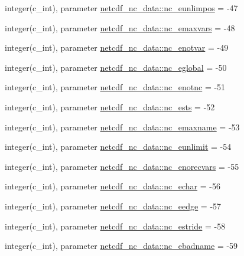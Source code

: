 \begin{DoxyCompactItemize}
\item 
integer(c\+\_\+int), parameter \hyperlink{namespacenetcdf__nc__data_a62be59604a485bc9d1259a8a94a9e501}{netcdf\+\_\+nc\+\_\+data\+::nc\+\_\+eunlimpos} = -\/47
\item 
integer(c\+\_\+int), parameter \hyperlink{namespacenetcdf__nc__data_a21a339b9ce80e3705aedc309fcb6be3c}{netcdf\+\_\+nc\+\_\+data\+::nc\+\_\+emaxvars} = -\/48
\item 
integer(c\+\_\+int), parameter \hyperlink{namespacenetcdf__nc__data_ae87507dd9130d6f4ef66daa3626cc6c8}{netcdf\+\_\+nc\+\_\+data\+::nc\+\_\+enotvar} = -\/49
\item 
integer(c\+\_\+int), parameter \hyperlink{namespacenetcdf__nc__data_a4bf9349dddd9a80ce363bb89be890f29}{netcdf\+\_\+nc\+\_\+data\+::nc\+\_\+eglobal} = -\/50
\item 
integer(c\+\_\+int), parameter \hyperlink{namespacenetcdf__nc__data_a54890d95abf2cb564d7294f2f7e04af6}{netcdf\+\_\+nc\+\_\+data\+::nc\+\_\+enotnc} = -\/51
\item 
integer(c\+\_\+int), parameter \hyperlink{namespacenetcdf__nc__data_a1d5fe03e609c4e9a402517518099f92e}{netcdf\+\_\+nc\+\_\+data\+::nc\+\_\+ests} = -\/52
\item 
integer(c\+\_\+int), parameter \hyperlink{namespacenetcdf__nc__data_aed1b24db9fb95b548b1b2c88d05cc036}{netcdf\+\_\+nc\+\_\+data\+::nc\+\_\+emaxname} = -\/53
\item 
integer(c\+\_\+int), parameter \hyperlink{namespacenetcdf__nc__data_a97e13a4f19397a41377c919316b1f75f}{netcdf\+\_\+nc\+\_\+data\+::nc\+\_\+eunlimit} = -\/54
\item 
integer(c\+\_\+int), parameter \hyperlink{namespacenetcdf__nc__data_ac9cf156c3357804270d95bef39921992}{netcdf\+\_\+nc\+\_\+data\+::nc\+\_\+enorecvars} = -\/55
\item 
integer(c\+\_\+int), parameter \hyperlink{namespacenetcdf__nc__data_a8b67da1d7539ef650246387c0a914653}{netcdf\+\_\+nc\+\_\+data\+::nc\+\_\+echar} = -\/56
\item 
integer(c\+\_\+int), parameter \hyperlink{namespacenetcdf__nc__data_a17523983ee6366a4460590b0a0622c40}{netcdf\+\_\+nc\+\_\+data\+::nc\+\_\+eedge} = -\/57
\item 
integer(c\+\_\+int), parameter \hyperlink{namespacenetcdf__nc__data_a687c32103bfa8244d01676f38387111c}{netcdf\+\_\+nc\+\_\+data\+::nc\+\_\+estride} = -\/58
\item 
integer(c\+\_\+int), parameter \hyperlink{namespacenetcdf__nc__data_a83da43e44429a69f612c4c22bc7b597f}{netcdf\+\_\+nc\+\_\+data\+::nc\+\_\+ebadname} = -\/59

\end{DoxyCompactItemize}
